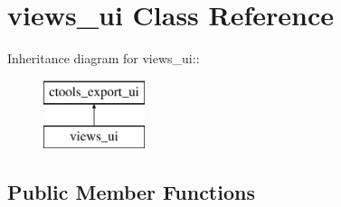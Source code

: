 \hypertarget{classviews__ui}{
\section{views\_\-ui Class Reference}
\label{classviews__ui}
}
Inheritance diagram for views\_\-ui::\begin{figure}[H]
\begin{center}
\leavevmode
\includegraphics[height=2cm]{classviews__ui}
\end{center}
\end{figure}
\subsection*{Public Member Functions}
